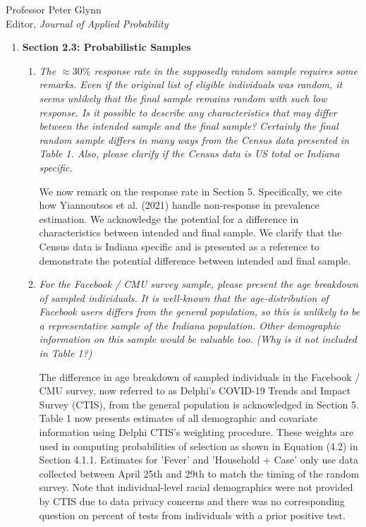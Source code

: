 \documentclass[11pt]{letter} %
\begin{document}
\begin{letter}{Professor
	Peter Glynn\\
	Editor, {\em Journal of Applied Probability}}
\begin{enumerate}
\begin{enumerate}
	Section 2.2.1 has a reconstructed timeline of restrictions, which was based on reported restrictions in the local Indiana news.  Between May 12th and April 28th, only high-risk individuals (symptomatic or having one of several important risk factors) were able to test.  After April 28th, suspected exposure was included as a reason for testing. We could not find any article mention travel history as a factor for testing in the public reports.
	\vspace{5mm}
\end{enumerate}
\item {\bf Section 2.3: Probabilistic Samples}
\begin{enumerate}
	\item {\it The $\approx 30\%$ response rate in the supposedly random sample requires some remarks. Even if the original list of eligible individuals was random, it seems unlikely that the final sample remains random with such low response. Is it possible to describe any characteristics that may differ between the intended sample and the final sample? Certainly the final random sample differs in many ways from the Census data presented in Table 1. Also, please clarify if the Census data is US total or Indiana specific. }
	\vspace{5mm}

	We now remark on the response rate in Section 5.  Specifically, we cite how Yiannoutsos et al. (2021) handle non-response in prevalence estimation.  We acknowledge the potential for a difference in characteristics between intended and final sample.  We clarify that the Census data is Indiana specific and is presented as a reference to demonstrate the potential difference between intended and final sample.

	\vspace{5mm}
	\item {\it For the Facebook / CMU survey sample, please present the age breakdown of sampled individuals. It is well-known that the age-distribution of Facebook users differs from the general population, so this is unlikely to be a representative sample of the Indiana population. Other demographic information on this sample would be valuable too. (Why is it not included in Table 1?)}
	\vspace{5mm}

	The difference in age breakdown of sampled individuals in the Facebook / CMU survey, now referred to as Delphi's COVID-19 Trends and Impact Survey (CTIS), from the general population is acknowledged in Section 5.  Table 1 now presents estimates of all demographic and covariate information using Delphi CTIS's weighting procedure.  These weights are used in computing probabilities of selection as shown in Equation (4.2) in Section 4.1.1. Estimates for 'Fever' and 'Household + Case' only use data collected between April 25th and 29th to match the timing of the random survey.  Note that individual-level racial demographics were not provided by CTIS due to data privacy concerns and there was no corresponding question on percent of tests from individuals with a prior positive test.


\end{enumerate}
\end{enumerate}
\end{letter}
\end{document}
